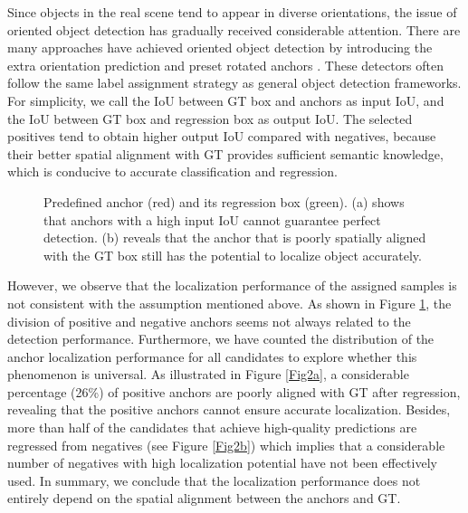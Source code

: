 \documentclass[letterpaper]{article} \usepackage{aaai21}  \usepackage{times}  \usepackage{helvet} \usepackage{courier}  \usepackage[hyphens]{url}  \usepackage{graphicx} \urlstyle{rm} \def\UrlFont{\rm}  \usepackage{natbib}  \usepackage{caption} \frenchspacing  \setlength{\pdfpagewidth}{8.5in}  \setlength{\pdfpageheight}{11in}  \usepackage{url}
\begin{document}
Since objects in the real scene tend to appear in diverse orientations, the issue of oriented object detection has gradually received considerable attention. There are many approaches have achieved oriented object detection by introducing the extra orientation prediction and preset rotated anchors \cite{ma2018arbitrary, liao2018textboxes++}. These detectors often follow the same label assignment strategy as general object detection frameworks. For simplicity, we call the IoU between GT box and anchors as input IoU, and the IoU between GT box and regression box as output IoU. The selected positives tend to obtain higher output IoU compared with negatives, because their better spatial alignment with GT provides sufficient semantic knowledge, which is conducive to accurate classification and regression.

\begin{figure}[t]
	\hspace{-1mm}
	\caption{Predefined anchor (red) and its regression box (green). (a) shows that anchors with a high input IoU cannot guarantee perfect detection. (b) reveals that the anchor that is poorly spatially aligned with the GT box still has the potential to localize object accurately.}
	\label{fig1}
\end{figure}
However, we observe that the localization performance of the assigned samples is not consistent with the assumption mentioned above. As shown in Figure \ref{fig1}, the division of positive and negative anchors seems not always related to the detection performance. Furthermore, we have counted the distribution of the anchor localization performance for all candidates to explore whether this phenomenon is universal. As illustrated in Figure \ref{Fig2a},  a considerable percentage (26\%) of  positive anchors are poorly aligned with GT after regression, revealing that the positive anchors cannot ensure accurate localization. Besides, more than half of the candidates that achieve high-quality predictions are regressed from negatives (see Figure \ref{Fig2b}) which  implies that a considerable number of negatives with high localization potential have not been effectively used. In summary, we conclude that the localization performance does not entirely depend on the spatial alignment between the anchors and GT. 
\end{document}
